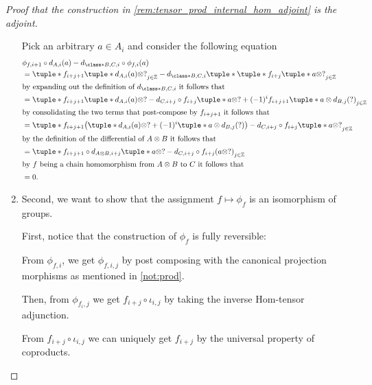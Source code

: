 \begin{proof}[Proof that the construction in \autoref{rem:tensor_prod_internal_hom_adjoint} is the adjoint]
\begin{enumerate}
{            %
            Pick an arbitrary \( a \in A_i \) and consider the following equation
            \begin{align*}
                &\phi_{f, i + 1} \circ d_{A, i}(a) - d_{\class*{B, C}, i} \circ \phi_{f, i}(a) \\
                &= \tuple*{ f_{i + j + 1}\tuple*{d_{A, i}(a) \otimes ?} }_{j \in \Zb}
                - d_{\class*{B, C}, i} \tuple*{ \tuple*{ f_{i + j}\tuple*{a \otimes ?} }_{j \in \Zb} } \\
                \intertext{by expanding out the definition of \( d_{\class*{B, C}, i} \) it follows that}
                &= \tuple*{ f_{i + j + 1}\tuple*{d_{A, i}(a) \otimes ?}
                - d_{C, i + j} \circ f_{i + j}\tuple*{a \otimes ?}
                + (-1)^i f_{i + j + 1}\tuple*{a \otimes d_{B, j}(?)} }_{j \in \Zb} \\
                \intertext{by consolidating the two terms that post-compose by \( f_{i + j + 1} \) it follows that}
                &= \tuple*{ f_{i + j + 1}\bigl( \tuple*{d_{A, i}(a) \otimes ?}
                + (-1)^i\tuple*{ a \otimes d_{B, j}(?) } \bigr)
                - d_{C, i + j} \circ f_{i + j}\tuple*{ a \otimes ? } }_{j \in \Zb} \\
                \intertext{by the definition of the differential of \( A \otimes B \) it follows that}
                &= \tuple*{ f_{i + j + 1} \circ d_{A \otimes B, i + j} \tuple*{ a \otimes ? }
                - d_{C, i + j} \circ f_{i + j} ( a \otimes ? ) }_{j \in \Zb} \\
                \intertext{by \( f \) being a chain homomorphism from \( A \otimes B \) to \( C \) it follows that}
                &= 0.
            \end{align*}
        }
        \item {
            Second, we want to show that the assignment \( f \mapsto \phi_f \) is an isomorphism of groups.

            First, notice that the construction of \( \phi_f \) is fully reversible:

            From \( \phi_{f, i} \), we get \( \phi_{f, i, j} \) by post composing with the canonical projection morphisms as mentioned in \autoref{not:prod}.

            Then, from \( \phi_{f_i, j} \) we get \( f_{i + j} \circ \iota_{i, j} \) by taking the inverse Hom-tensor adjunction.

            From \( f_{i + j} \circ \iota_{i, j} \) we can uniquely get \( f_{i + j} \) by the universal property of coproducts.

}
\end{enumerate}
\end{proof}
